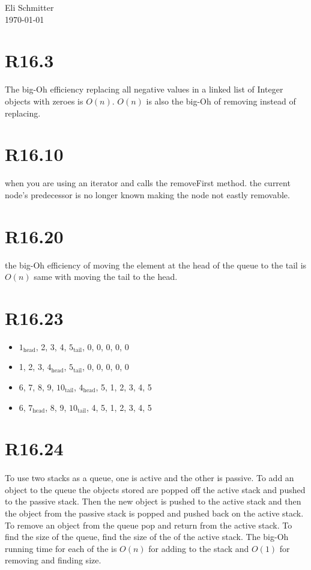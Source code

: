 \documentclass{article}
\begin{document}
\begin{flushleft}
  Eli Schmitter\\
  \today
\end{flushleft}
\section{R16.3}
The big-Oh efficiency replacing all negative values in a linked list of Integer objects with zeroes is $O(n)$.  $O(n)$ is also the big-Oh of removing instead of replacing.
\section{R16.10}
when you are using an iterator and calls the removeFirst method. the current node's predecessor is no longer known making the node not eastly removable.
\section{R16.20}
the big-Oh efficiency of moving the element at the head of the queue to the tail is $O(n)$ same with moving the tail to the head.
\section{R16.23}
\begin{itemize}
  \item $1_{\text{head}}$, 2, 3, 4, $5_{\text{tail}}$, 0, 0, 0, 0, 0
  \item 1, 2, 3, $4_{\text{head}}$, $5_{\text{tail}}$, 0, 0, 0, 0, 0
  \item 6, 7, 8, 9, $10_{\text{tail}}$, $4_{\text{head}}$, 5, 1, 2, 3, 4, 5
  \item 6, $7_{\text{head}}$, 8, 9, $10_{\text{tail}}$, 4, 5, 1, 2, 3, 4, 5
\end{itemize}
\section{R16.24}
\paragraph{}To use two stacks as a queue, one is active and the other is passive. To add an object to the queue the objects stored are popped off the active stack and pushed to the passive stack. Then the new object is pushed to the active stack and then the object from the passive stack is popped and pushed back on the active stack. To remove an object from the queue pop and return from the active stack. To find the size of the queue, find the size of the of the active stack. The big-Oh running
time for each of the is $O(n)$ for adding to the stack and $O(1)$ for removing and finding size.
\end{document}
